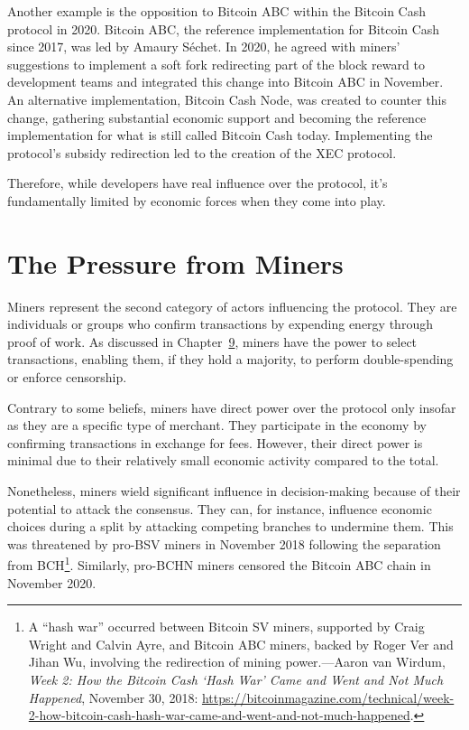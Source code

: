 \documentclass[
  a5paper,
  smalldemyvopaper,10pt,twoside,onecolumn,openright,extrafontsizes,hidelinks]{memoir}
\begin{document}
Another example is the opposition to Bitcoin ABC within the Bitcoin Cash
protocol in 2020. Bitcoin ABC, the reference implementation for Bitcoin
Cash since 2017, was led by Amaury Séchet. In 2020, he agreed with
miners' suggestions to implement a soft fork redirecting part of the
block reward to development teams and integrated this change into
Bitcoin ABC in November. An alternative implementation, Bitcoin Cash
Node, was created to counter this change, gathering substantial economic
support and becoming the reference implementation for what is still
called Bitcoin Cash today. Implementing the protocol's subsidy
redirection led to the creation of the XEC protocol.

Therefore, while developers have real influence over the protocol, it's
fundamentally limited by economic forces when they come into play.

\section*{The Pressure from Miners}\label{the-pressure-from-miners}


Miners represent the second category of actors influencing the protocol.
They are individuals or groups who confirm transactions by expending
energy through proof of work. As discussed in
Chapter~\hyperref[ch:censure]{9}, miners have the power to select
transactions, enabling them, if they hold a majority, to perform
double-spending or enforce censorship.

Contrary to some beliefs, miners have direct power over the protocol
only insofar as they are a specific type of merchant. They participate
in the economy by confirming transactions in exchange for fees. However,
their direct power is minimal due to their relatively small economic
activity compared to the total.

Nonetheless, miners wield significant influence in decision-making
because of their potential to attack the consensus. They can, for
instance, influence economic choices during a split by attacking
competing branches to undermine them. This was threatened by pro-BSV
miners in November 2018 following the separation from BCH\footnote{A
  ``hash war'' occurred between Bitcoin SV miners, supported by Craig
  Wright and Calvin Ayre, and Bitcoin ABC miners, backed by Roger Ver
  and Jihan Wu, involving the redirection of mining power.---Aaron van
  Wirdum, \emph{Week 2: How the Bitcoin Cash `Hash War' Came and Went
  and Not Much Happened}, November 30, 2018:
  \url{https://bitcoinmagazine.com/technical/week-2-how-bitcoin-cash-hash-war-came-and-went-and-not-much-happened}.}.
Similarly, pro-BCHN miners censored the Bitcoin ABC chain in November
2020.
\end{document}
